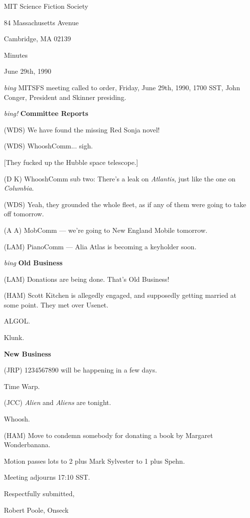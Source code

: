 \setlength{\topmargin}{-0.5in}
\setlength{\oddsidemargin}{0.0in}
\setlength{\evensidemargin}{0.0in}
\setlength{\textheight}{9in}
\setlength{\textwidth}{6.5in}



\begin{center}
MIT Science Fiction Society

84 Massachusetts Avenue

Cambridge, MA 02139

\vspace{0.2in}
Minutes

June 29th, 1990

\end{center}
 
\vspace{0.15in}
{\em bing\/}  MITSFS meeting called to order, Friday, June 29th, 1990,
1700 SST, John Conger, President and Skinner presiding.

\vspace{.15in}
{\em bing!\/}  {\bf Committee Reports\/}

(WDS) We have found the missing Red Sonja novel!

(WDS) WhooshComm... sigh.

[They fucked up the Hubble space telescope.]

(D K) WhooshComm sub two: There's a leak on {\em Atlantis\/}, just like the
one on {\em Columbia\/}.

(WDS) Yeah, they grounded the whole fleet, as if any of them were going to take
off tomorrow.

(A A) MobComm --- we're going to New England Mobile tomorrow.

(LAM) PianoComm --- Alia Atlas is becoming a keyholder soon.

\vspace{.15in}
{\em bing\/} {\bf Old Business\/}

(LAM) Donations are being done.  That's Old Business!

(HAM) Scott Kitchen is allegedly engaged, and supposedly getting married at
some point.  They met over Usenet.

ALGOL.

Klunk.

\vspace{0.15in}
{\bf New Business\/}

(JRP) 1234567890 will be happening in a few days.

Time Warp.

(JCC) {\em Alien\/} and {\em Aliens\/} are tonight.

Whoosh.

(HAM) Move to condemn somebody for donating a book by Margaret Wonderbanana.

Motion passes lots to 2 plus Mark Sylvester to 1 plus Spehn.

Meeting adjourns 17:10 SST.

\vspace{0.15in}
\begin{center}
Respectfully submitted,

Robert Poole, Onseck
\end{center}

